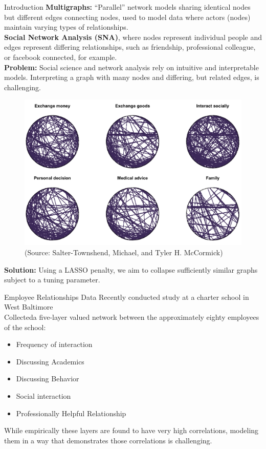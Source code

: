 \documentclass[final]{beamer}
\newlength{\onecolwid}
\begin{document}
\begin{frame}[t]
\begin{columns}[t]
\begin{column}{\onecolwid}
\begin{block}{Introduction}
  \textbf{Multigraphs:}
  ``Parallel'' network models sharing identical nodes but different
  edges connecting nodes, used to model data where
  actors (nodes) maintain varying types of relationships.\\
  \textbf{Social Network Analysis (SNA)}, where nodes represent
  individual people and edges represent differing relationships, such
  as friendship, professional colleague, or facebook connected, for
  example.\\
  \textbf{Problem:} Social science and network analysis rely
  on intuitive and interpretable models.  Interpreting a graph with
  many nodes and differing, but related edges, is challenging.
  \begin{figure}
    \centering
    \includegraphics{complexMultigraph.png}
    \caption{(Source: Salter-Townshend, Michael, and Tyler H. McCormick)}
  \end{figure}
  \textbf{Solution:} Using a LASSO penalty, we aim to collapse
  sufficiently similar graphs subject to a tuning parameter.
\end{block}

\begin{block}{Employee Relationships Data}
  Recently conducted study at a charter school in West Baltimore\\
  Collecteda five-layer valued network between the
  approximately eighty employees of the school:
  \begin{itemize}
  \item Frequency of interaction
  \item Discussing Academics
  \item Discussing Behavior
  \item Social interaction
  \item Professionally Helpful Relationship
  \end{itemize}
While empirically these layers are found to have very high
correlations, modeling them in a way that demonstrates those
correlations is challenging.
\end{block}



\end{column}
\end{columns}
\end{frame}
\end{document}

